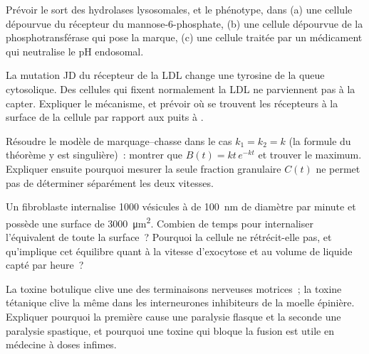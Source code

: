 \begin{exercise}[$\star\star$]\label{exo:b3:membrane-traffic:8}
Prévoir le sort des hydrolases lysosomales, et le phénotype, dans
(a) une cellule dépourvue du récepteur du mannose-6-phosphate, (b) une
cellule dépourvue de la phosphotransférase qui pose la marque, (c) une
cellule traitée par un médicament qui neutralise le pH endosomal.
\end{exercise}

\begin{exercise}[$\star\star$]\label{exo:b3:membrane-traffic:9}
La mutation JD du récepteur de la LDL change une tyrosine de la queue
cytosolique. Des cellules qui fixent normalement la LDL ne parviennent
pas à la capter. Expliquer le mécanisme, et prévoir où se trouvent les
récepteurs à la surface de la cellule par rapport aux puits à .
\end{exercise}

\begin{exercise}[$\star\star\star$]\label{exo:b3:membrane-traffic:10}
Résoudre le modèle de marquage--chasse dans le cas $k_{1} = k_{2} = k$
(la formule du théorème y est singulière)~: montrer que
$B(t) = kt\,e^{-kt}$ et trouver le maximum. Expliquer ensuite pourquoi
mesurer la seule fraction granulaire $C(t)$ ne permet pas de déterminer
séparément les deux vitesses.
\end{exercise}

\begin{exercise}[$\star\star\star$]\label{exo:b3:membrane-traffic:11}
Un fibroblaste internalise \num{1000} vésicules à  de
\qty{100}{nm} de diamètre par minute et possède une surface de
\qty{3000}{\micro m^2}. Combien de temps pour internaliser l'équivalent
de toute la surface~? Pourquoi la cellule ne rétrécit-elle pas, et
qu'implique cet équilibre quant à la vitesse d'exocytose et au volume
de liquide capté par heure~?
\end{exercise}

\begin{exercise}[$\star\star\star$]\label{exo:b3:membrane-traffic:12}
La toxine botulique clive une  des terminaisons nerveuses
motrices~; la toxine tétanique clive la même  dans les
interneurones inhibiteurs de la moelle épinière. Expliquer pourquoi la
première cause une paralysie flasque et la seconde une paralysie
spastique, et pourquoi une toxine qui bloque la fusion est utile en
médecine à doses infimes.
\end{exercise}

